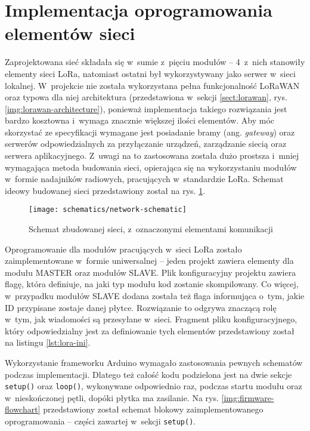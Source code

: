 \section{Implementacja oprogramowania elementów sieci\label{sect:firmware-network}} Zaprojektowana sieć składała się
w~sumie z~pięciu modułów -- 4~z~nich stanowiły elementy sieci LoRa, natomiast ostatni był wykorzystywany jako serwer
w~sieci lokalnej. W~projekcie nie została wykorzystana pełna funkcjonalność LoRaWAN oraz typowa dla niej architektura
(przedstawiona w~sekcji \ref{sect:lorawan}, rys. \ref{img:lorawan-architecture}), ponieważ implementacja takiego
rozwiązania jest bardzo kosztowna i~wymaga znacznie większej ilości elementów. Aby móc skorzystać ze specyfikacji
wymagane jest posiadanie bramy (ang. \textsl{gateway}) oraz serwerów odpowiedzialnych za przyłączanie urządzeń,
zarządzanie siecią oraz serwera aplikacyjnego. Z~uwagi na to zastosowana została dużo prostsza i~mniej wymagająca metoda
budowania sieci, opierająca się na wykorzystaniu modułów w~formie nadajników radiowych, pracujących w~standardzie LoRa.
Schemat ideowy budowanej sieci przedstawiony został na rys. \ref{img:network-schematic}.

\begin{figure}[!htbp]
    \centering
    \texttt{[image: schematics/network-schematic]}
    \caption{\label{img:network-schematic}Schemat zbudowanej sieci, z~oznaczonymi elementami komunikacji}
\end{figure}

Oprogramowanie dla modułów pracujących w~sieci LoRa zostało zaimplementowane w~formie uniwersalnej -- jeden projekt
zawiera elementy dla modułu MASTER oraz modułów SLAVE. Plik konfiguracyjny projektu zawiera flagę, która definiuje, na
jaki typ modułu kod zostanie skompilowany. Co więcej, w~przypadku modułów SLAVE dodana została też flaga informująca
o~tym, jakie ID przypisane zostaje danej płytce. Rozwiązanie to odgrywa znaczącą rolę w~tym, jak wiadomości są
przesyłane w~sieci. Fragment pliku konfiguracyjnego, który odpowiedzialny jest za definiowanie tych elementów
przedstawiony został na listingu \ref{lst:lora-ini}.



Wykorzystanie frameworku Arduino wymagało zastosowania pewnych schematów podczas implementacji. Dlatego też całość kodu
podzielona jest na dwie sekcje \texttt{setup()} oraz \texttt{loop()}, wykonywane odpowiednio raz, podczas startu modułu
oraz w~nieskończonej pętli, dopóki płytka ma zasilanie. Na rys. \ref{img:firmware-flowchart} przedstawiony został
schemat blokowy zaimplementowanego oprogramowania -- części zawartej w~sekcji \texttt{setup()}.

